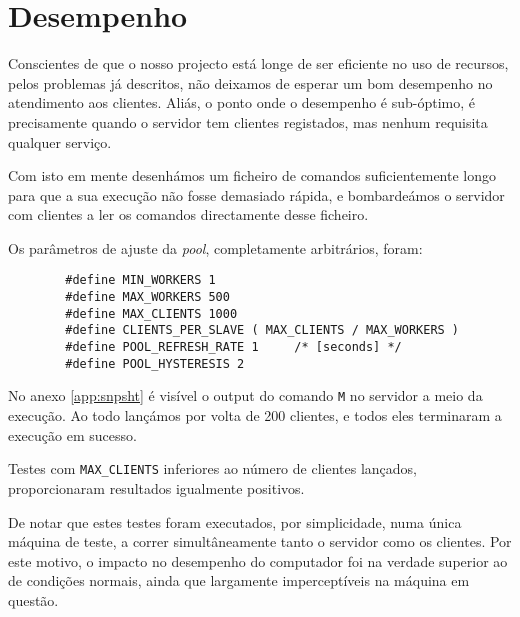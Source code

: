 \section{Desempenho\label{sec:Desempenho}}

	\indent\indent Conscientes de que o nosso projecto está longe de ser eficiente no uso de recursos, pelos problemas já descritos, não deixamos de esperar um bom desempenho no atendimento aos clientes.
	Aliás, o ponto onde o desempenho é sub-óptimo, é precisamente quando o servidor tem clientes registados, mas nenhum requisita qualquer serviço.
	
	Com isto em mente desenhámos um ficheiro de comandos suficientemente longo para que a sua execução não fosse demasiado rápida, e bombardeámos o servidor com clientes a ler os comandos directamente desse ficheiro.
	
	Os parâmetros de ajuste da \emph{pool}, completamente arbitrários, foram:
	
	\begin{lstlisting}
		#define MIN_WORKERS 1
		#define MAX_WORKERS 500
		#define MAX_CLIENTS 1000
		#define CLIENTS_PER_SLAVE ( MAX_CLIENTS / MAX_WORKERS )
		#define POOL_REFRESH_RATE 1		/* [seconds] */
		#define POOL_HYSTERESIS 2
	\end{lstlisting}

	No anexo \ref{app:snpsht} é visível o output do comando \verb|M| no servidor a meio da execução.
	Ao todo lançámos por volta de 200 clientes, e todos eles terminaram a execução em sucesso.
	
	Testes com \verb|MAX_CLIENTS| inferiores ao número de clientes lançados, proporcionaram resultados igualmente positivos.
	
	De notar que estes testes foram executados, por simplicidade, numa única máquina de teste, a correr simultâneamente tanto o servidor como os clientes.
	Por este motivo, o impacto no desempenho do computador foi na verdade superior ao de condições normais, ainda que largamente imperceptíveis na máquina em questão.
	
	
\clearpage
